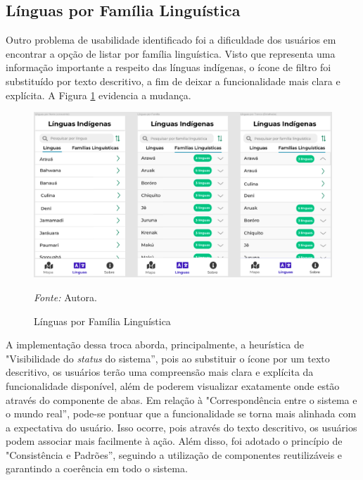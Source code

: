 \subsection{Línguas por Família Linguística}
\label{sec:Familia Linguistica}
Outro problema de usabilidade identificado foi a dificuldade dos usuários em encontrar a opção de listar por família linguística. Visto que representa uma informação importante a respeito das línguas indígenas, 
o ícone de filtro foi substituído por texto descritivo, a fim de deixar a funcionalidade mais clara e  explícita. A Figura \ref{fig24} evidencia a mudança.

\begin{figure}[h!]
	\centering
	\caption{Línguas por Família Linguística}
	\begin{adjustbox}{center}
		\includegraphics[width=1\textwidth]{figuras/linguas.eps}
	\end{adjustbox}
		\begin{tablenotes}[flushleft]
		\centering
		\item \textit{Fonte:} Autora.
	\end{tablenotes}
	\label{fig24}
\end{figure}

A implementação dessa troca aborda, principalmente, a heurística de "Visibilidade do \textit{status} do sistema'', pois ao substituir o ícone por um texto descritivo, os usuários terão uma compreensão mais clara e explícita da 
funcionalidade disponível, além de poderem visualizar exatamente onde estão através do componente de abas. Em relação à "Correspondência entre o sistema e o mundo real'', pode-se pontuar que a funcionalidade se torna mais 
alinhada com a expectativa do usuário. Isso ocorre, pois através do texto descritivo, os usuários podem associar mais facilmente à ação. Além disso, foi adotado o princípio de "Consistência e Padrões'', seguindo a utilização de componentes 
reutilizáveis e garantindo a coerência em todo o sistema. 

